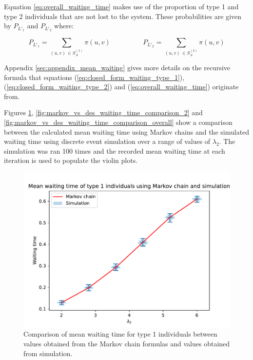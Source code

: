 Equation \ref{eq:overall_waiting_time} makes use of the proportion of type 1 
and type 2 individuals that are not lost to the system. These probabilities are 
given by \(P_{L'_1}\) and \(P_{L'_2}\) where:

\begin{equation}\label{eq:proportion_of_accepting_individuals}
    P_{L'_1} = \sum_{(u,v) \, \in S_A^{(1)}} \pi(u,v) \hspace{2cm}
    P_{L'_2} = \sum_{(u,v) \, \in S_A^{(2)}} \pi(u,v)
\end{equation}
 
Appendix \ref{sec:appendix_mean_waiting} gives more details on the recursive
formula that equations (\ref{eq:closed_form_waiting_type_1}),
(\ref{eq:closed_form_waiting_type_2}) and (\ref{eq:overall_waiting_time})
originate from. 

Figures \ref{fig:markov_vs_des_waiting_time_comparison_1},
\ref{fig:markov_vs_des_waiting_time_comparison_2} and
\ref{fig:markov_vs_des_waiting_time_comparison_overall} show a comparison 
between the calculated mean waiting time using Markov chains and the simulated 
waiting time using discrete event simulation over a range of values of 
\(\lambda_2\).
The simulation was ran 100 times and the recorded mean waiting time at each 
iteration is used to populate the violin plots.

\begin{figure}[H]
    \centering
    \includegraphics[width=.8\textwidth]{imgs/waiting_time_comparison/waiting_1.pdf}
    \caption{
        Comparison of mean waiting time for type 1 individuals between values 
        obtained from the Markov chain formulas and values obtained from 
        simulation.
    }
    \label{fig:markov_vs_des_waiting_time_comparison_1}
\end{figure}

